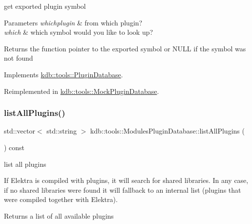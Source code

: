 get exported plugin symbol 


\begin{DoxyParams}{Parameters}
{\em whichplugin} & from which plugin? \\
\hline
{\em which} & which symbol would you like to look up?\\
\hline
\end{DoxyParams}
\begin{DoxyReturn}{Returns}
the function pointer to the exported symbol or N\+U\+LL if the symbol was not found 
\end{DoxyReturn}


Implements \hyperlink{classkdb_1_1tools_1_1PluginDatabase_a87b5ef6ee66ce1ad46cc590a2b60b9fa}{kdb\+::tools\+::\+Plugin\+Database}.



Reimplemented in \hyperlink{classkdb_1_1tools_1_1MockPluginDatabase_a5a701fd310be0e9f7d14a865c0226517}{kdb\+::tools\+::\+Mock\+Plugin\+Database}.

\mbox{\label{classkdb_1_1tools_1_1ModulesPluginDatabase_a3fa5a08caf47cb79f9889641a96f197b}} 
\subsubsection{\texorpdfstring{list\+All\+Plugins()}{listAllPlugins()}}
{\footnotesize\ttfamily std\+::vector$<$ std\+::string $>$ kdb\+::tools\+::\+Modules\+Plugin\+Database\+::list\+All\+Plugins (\begin{DoxyParamCaption}{ }\end{DoxyParamCaption}) const\hspace{0.3cm}{\ttfamily [virtual]}}



list all plugins 

If Elektra is compiled with plugins, it will search for shared libraries. In any case, if no shared libraries were found it will fallback to an internal list (plugins that were compiled together with Elektra).

\begin{DoxyReturn}{Returns}
a list of all available plugins 
\end{DoxyReturn}


